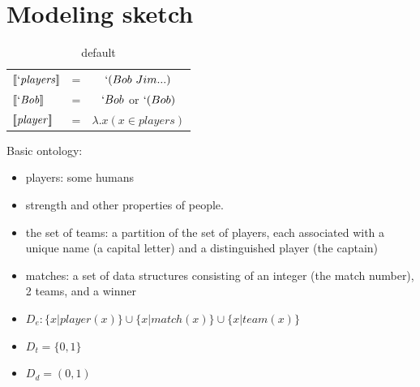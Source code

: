 \documentclass[pdfextras]{handbook}
\newcommand{\llbracket}{\ensuremath{\left [\!\left [}}%
\newcommand{\rrbracket}{\ensuremath{\right ]\!\right ]}}
\providecommand{\sv}[1]{\ensuremath{\llbracket \mathit{#1} \rrbracket}}
\begin{document}
\section{Modeling sketch}

\begin{table}[htdp]
\caption{default}
\begin{center}
\begin{tabular}{llc}
\sv{`players}&= & $`(Bob\ Jim ...)$ \\
\sv{`Bob}&= & $`Bob$ or $`(Bob)$ \\
\sv{player}&= & $\lambda.x (x\in players) $ \\
 
\end{tabular}
\end{center}
\label{default}
\end{table}%



\noindent Basic ontology: 
\begin{itemize}
\item players: some humans
\item strength and other properties of people.
\item the set of teams: a partition of the set of players, each associated with a unique name (a capital letter) and a distinguished player (the captain)
\item matches: a set of data structures consisting of an integer (the match number), 2 teams, and a winner
\item $D_e: \{x|\mathit{player}(x)\} \cup \{x|\mathit{match}(x)\} \cup \{x|\mathit{team}(x)\}$
\item $D_t = \{0,1\}$
\item $D_d = (0,1)$
\end{itemize}
\end{document}

